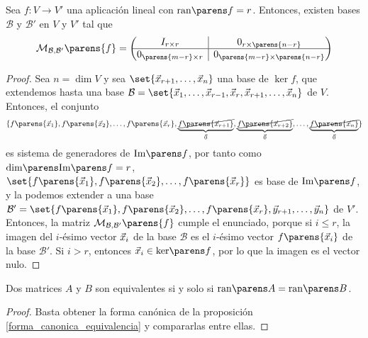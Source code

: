 \documentclass[../algebra_lineal.tex]{subfiles}
\begin{document}
\begin{proposition}
    \label{forma_canonica_equivalencia}
    Sea $f : V \to V'$ una aplicación lineal con $\ran{f} = r$. Entonces, existen bases $\mathcal{B}$ y $\mathcal{B'}$ en $V$ y $V'$ tal que 
    \[
        \mathcal{M}_{\mathcal{B}, \mathcal{B'}}\parens{f} = 
        \begin{pmatrix}
            I_{r \times r}
            & \rvline & 0_{r \times \parens{n-r}} \\
          \hline
          0_{\parens{m-r} \times r} & \rvline &
          0_{\parens{m-r} \times \parens{n-r}}
          \end{pmatrix}
    \]

\end{proposition}

\begin{proof}
    Sea $n=\dim{V}$ y sea $\set{\vx_{r+1}, \dots, \vx_{n}}$ una base de $\ker{f}$, que extendemos hasta una base $\mathcal{B}=\set{\cvlst{x}{n}{r}}$ de $V$. Entonces, el conjunto 
    \[
       \{ f\parens{\vx_1}, f\parens{\vx_2}, \dots, f\parens{\vx_r}, \underbrace{\cancel{f\parens{\vx_{r+1}}}}_{\zv}, \underbrace{\cancel{f\parens{\vx_{r+2}}}}_{\zv}, \dots, \underbrace{\cancel{f\parens{\vx_{n}}}}_{\zv} \}  
    \]
    es sistema de generadores de $\im{f}$, por tanto como $\dim{\im{f}} = r$, $\set{f\parens{\vx_1}, f\parens{\vx_2}, \dots, f\parens{\vx_r}}$ es base de $\im{f}$, y la podemos extender a una base $\mathcal{B'} = \set{f\parens{\vx_1}, f\parens{\vx_2}, \dots, f\parens{\vx_r}, \vy_{r+1}, \dots, \vy_n}$ de $V'$. Entonces, la matriz $\mathcal{M}_{\mathcal{B}, \mathcal{B'}}\parens{f}$ cumple el enunciado, porque si $i \le r$, la imagen del $i$-ésimo vector $\vec{x}_i$ de la base $\mathcal{B}$ es el $i$-ésimo vector $f\parens{\vx_i}$ de la base $\mathcal{B}'$. Si $i > r$, entonces $\vx_i \in \ker{f}$, por lo que la imagen es el vector nulo.  
\end{proof}

\begin{corollary}
    Dos matrices $A$ y $B$ son equivalentes si y solo si $\ran{A} = \ran{B}$.
\end{corollary}
\begin{proof}
    Basta obtener la forma canónica de la proposición \ref{forma_canonica_equivalencia} y compararlas entre ellas.
\end{proof}
\end{document}
